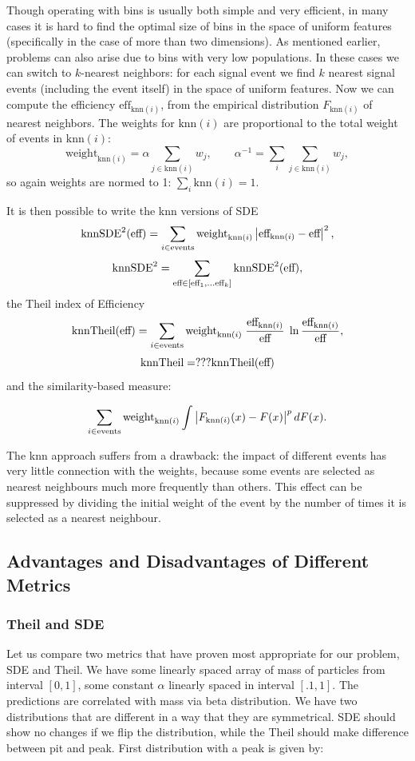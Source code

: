 \def\knni{\text{knn}(i)}
\def\effknni{\text{eff}_{\knni}}
\def\weightknni{\text{weight}_{\knni}}
\def\Fknn{F_{\knni}}

\def\knnSDE{\text{knnSDE}}

Though operating with bins is usually both simple and very efficient, 
in many cases it is hard to find the optimal size of bins in the space of uniform features (specifically in the case of more than two dimensions).
As mentioned earlier, problems can also arise due to bins with very low populations.
In these cases we can switch to $k$-nearest neighbors: for each signal event we find $k$ nearest signal events (including the event itself)
in the space of uniform features. Now we can compute the efficiency $\effknni$, from the empirical distribution $\Fknn$ of nearest neighbors. 
The weights for $\knni$ are proportional to the total weight of events in $\knni$:
\[
	\weightknni = \alpha \sum_{j \in \knni} w_j, \qquad \alpha^{-1} = \sum_i \sum_{j \in \knni} w_j,
\]
so again weights are normed to 1: $\sum_{i} \knni = 1$. 

It is then possible to write the knn versions of SDE
\[
	\knnSDE^2(\globaleff)
		= \sum_{i \in \text{events}} \weightknni \abs{\effknni - \globaleff}^2,
\]
\[
	\knnSDE^2 = \sum_{\globaleff \in [\globaleff_1, \dots \globaleff_k]}
		\knnSDE^2(\globaleff),
\]
the Theil index of Efficiency
\[
	\text{knnTheil}(\globaleff) = \sum_{i \in \text{events}} \weightknni \; \frac{\effknni}{\globaleff} \; \ln{\frac{\effknni}{\globaleff}},
\]
\[
	\text{knnTheil} = ??? \text{knnTheil}(\text{eff})
\]
and the similarity-based measure:

\[
	 \sum_{i \in \text{events}} \weightknni \int \abs{\Fknn(x) - F(x)}^p dF(x).
\]


The knn approach suffers from a drawback: the impact of different events has very little connection with the weights,
because some events are selected as nearest neighbours much more frequently than others.
This effect can be suppressed by dividing the initial weight of the event by the number of times it is selected 
as a nearest neighbour. 

\subsection{Advantages and Disadvantages of Different Metrics}
\subsubsection{Theil and SDE}
Let us compare two metrics that have proven most appropriate for our problem, SDE and Theil. We have some linearly spaced array of mass of particles
from interval $[0,1]$, some constant $\alpha$ linearly spaced in interval $[.1,1]$. The predictions are correlated with mass via beta distribution.
We have two distributions that are different in a way that they are symmetrical. SDE should show no changes if we flip the distribution, while the Theil should make difference between pit and peak. First distribution with a peak is given by:

